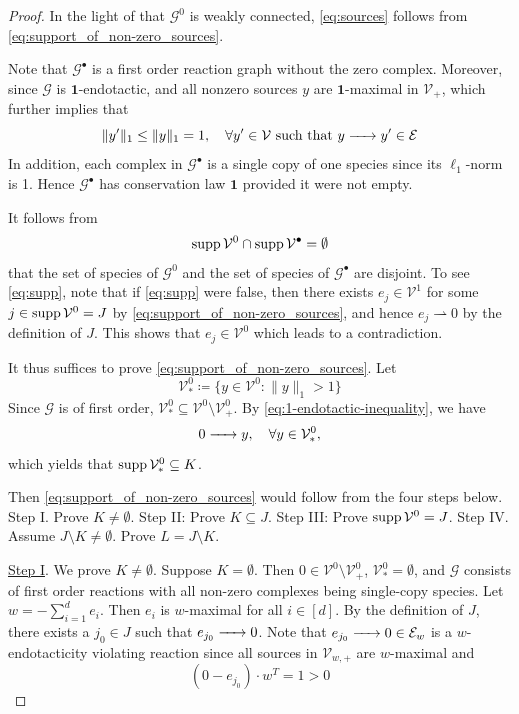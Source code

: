 \documentclass[10pt]{amsart}
\numberwithin{equation}{section}
\theoremstyle{plain}
\theoremstyle{definition}
\theoremstyle{remark}
\newcommand{\cE}{\mathcal{E}}
\newcommand{\cG}{\mathcal{G}}
\newcommand{\cV}{\mathcal{V}}
\newcommand{\supp}{{\rm supp\,}}
\begin{document}
\begin{proof}
In the light of that $\cG^0$ is weakly connected,  \eqref{eq:sources} follows from
\eqref{eq:support_of_non-zero_sources}.


Note that $\cG^{\bullet}$ is a first order reaction graph without the zero complex. Moreover, since $\cG$ is $\mathbf{1}$-endotactic, and all nonzero sources $y$ are $\mathbf{1}$-maximal in $\cV_+$, which further implies that 
 \begin{equation}\label{eq:1-endotactic-inequality}
\|y'\|_1\le\|y\|_1=1,\quad \forall  y'\in\cV\ \text{such that}\ y\ce{->}y'\in\cE
\end{equation}
 In addition, each complex in $\cG^{\bullet}$ is a single copy of one species since its $\ell_1$-norm is 1. Hence $\cG^{\bullet}$  has conservation law $\mathbf{1}$ provided it were not empty. 

It follows from \begin{equation}\label{eq:supp}\supp\cV^0\cap\supp \cV^{\bullet}=\emptyset
\end{equation} that the set of species of $\cG^0$ and the set of species of $\cG^{\bullet}$ are disjoint. To see \eqref{eq:supp}, note that if \eqref{eq:supp} were false, then there exists $e_j\in\cV^1$ for some  $j\in \supp\cV^0=J$ by \eqref{eq:support_of_non-zero_sources}, and hence $e_j\rightharpoonup 0$ by the definition of $J$. This shows that $e_j\in\cV^0$ which leads to a contradiction.

It thus suffices to prove  \eqref{eq:support_of_non-zero_sources}.
 Let  \begin{equation}\label{eq:V-star-0}
\cV^0_*\coloneqq\{y\in\cV^0\colon \|y\|_1>1\}
\end{equation} Since $\cG$ is of first order, $\cV^0_*\subseteq\cV^0\setminus\cV^0_+$. By \eqref{eq:1-endotactic-inequality}, we have
\[0\ce{->}y,\quad \forall y\in\cV^0_*,\]
which yields that $\supp\cV^0_*\subseteq K$.

Then \eqref{eq:support_of_non-zero_sources} would follow from the four steps below. Step I. Prove  $K\neq\emptyset$. Step II: Prove $K\subseteq J$.  Step III: 
Prove $\supp\cV^0= J$. Step IV. Assume $J\setminus K\neq\emptyset$. Prove $L= J\setminus K$.
\medskip


\noindent \underline{Step I}. We prove $K\neq\emptyset$. Suppose $K=\emptyset$. Then  $0\in\cV^0\setminus\cV^0_+$, $\cV_*^0=\emptyset$,  and $\cG$ consists of first order reactions with all non-zero complexes being single-copy species.  Let $w=-\sum_{i=1}^de_i$. Then $e_i$ is $w$-maximal for all $i\in[d]$. By the definition of $J$, there exists a $j_0\in J$ such that $e_{j_0}\ce{->}0$. Note that $e_{j_0}\ce{->}0\in\cE_w$ is a $w$-endotacticity violating reaction since all sources in $\cV_{w,+}$ are $w$-maximal and
\[(0-e_{j_0})\cdot w^T=1>0\]
\medskip


\end{proof}
\end{document}
